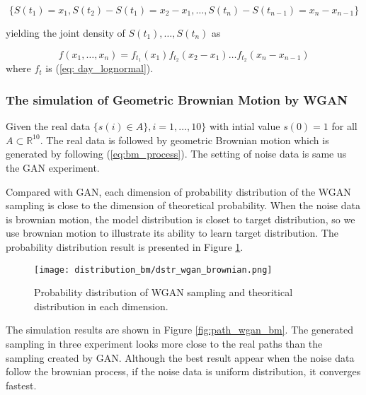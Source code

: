 \documentclass{article}
\begin{document}
	{\small 	\[\{ S(t_{1}) = x_1, S(t_{2}) - S(t_{1}) = x_{2} -x_{1}, \dots, S(t_{n}) - S(t_{n-1})  = x_n - x_{n-1} \}\]}
	
	yielding the joint density of $S(t_{1}), \dots, S(t_{n})$ as
	
	\begin{equation}
	f(x_1, \dots, x_n) = f_{t_{1}}(x_1)  f_{t_{2}}(x_{2} -x_{1})\dots f_{t_{2}}(x_{n} -x_{n-1})
	\end{equation}
	where $f_{t}$ is (\ref{eq: day_lognormal}).
	

	\subsubsection{The simulation of Geometric Brownian Motion by WGAN} \label{sec:exp_gbm_wgan}
	
	Given the real data $\{ s(i)\in A \}, i = 1, \dots, 10\}$ with intial  value $s(0)=1$ for all $A \subset \mathbb{R}^{10}$.
	The real data is followed by geometric Brownian motion which is generated by following (\ref{eq:bm_process}).
	The setting of noise data is same us the GAN experiment. 
	
	Compared with GAN, each dimension of probability distribution of the WGAN sampling is close to the dimension of theoretical probability. 
	When the noise data is brownian motion, the model distribution is closet to target distribution, so we use brownian motion to illustrate its ability to learn target distribution.
	The probability distribution result is presented in Figure \ref{fig:dstr_wgan_brownian}.
	
	\begin{figure}[h]
		\centering
		\texttt{[image: distribution\_bm/dstr\_wgan\_brownian.png]}
		\caption{Probability distribution of WGAN sampling and theoritical distribution in each dimension.}
		\label{fig:dstr_wgan_brownian}
	\end{figure}
	
	
	
	
	The simulation results are shown in Figure \ref{fig:path_wgan_bm}. 
	The generated sampling in three experiment looks more close to the real paths than the sampling created by GAN.
	Although the best result appear when the noise data follow the brownian process, if the noise data is uniform distribution, it converges fastest. 
	
\end{document}
